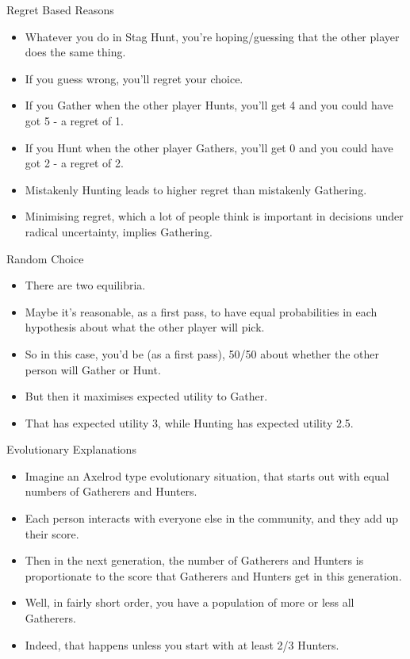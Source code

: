 \documentclass[
  ignorenonframetext,
]{beamer}
\providecommand{\tightlist}{%
  \setlength{\itemsep}{0pt}\setlength{\parskip}{0pt}}
\begin{document}
\begin{frame}{Regret Based Reasons}
\protect\hypertarget{regret-based-reasons}{}
\begin{itemize}
\tightlist
\item
  Whatever you do in Stag Hunt, you're hoping/guessing that the other
  player does the same thing.
\item
  If you guess wrong, you'll regret your choice. \pause
\item
  If you Gather when the other player Hunts, you'll get 4 and you could
  have got 5 - a regret of 1. \pause
\item
  If you Hunt when the other player Gathers, you'll get 0 and you could
  have got 2 - a regret of 2. \pause
\item
  Mistakenly Hunting leads to higher regret than mistakenly Gathering.
\item
  Minimising regret, which a lot of people think is important in
  decisions under radical uncertainty, implies Gathering.
\end{itemize}
\end{frame}

\begin{frame}{Random Choice}
\protect\hypertarget{random-choice}{}
\begin{itemize}
\tightlist
\item
  There are two equilibria.
\item
  Maybe it's reasonable, as a first pass, to have equal probabilities in
  each hypothesis about what the other player will pick.
\item
  So in this case, you'd be (as a first pass), 50/50 about whether the
  other person will Gather or Hunt. \pause
\item
  But then it maximises expected utility to Gather.
\item
  That has expected utility 3, while Hunting has expected utility 2.5.
\end{itemize}
\end{frame}

\begin{frame}{Evolutionary Explanations}
\protect\hypertarget{evolutionary-explanations}{}
\begin{itemize}
\tightlist
\item
  Imagine an Axelrod type evolutionary situation, that starts out with
  equal numbers of Gatherers and Hunters.
\item
  Each person interacts with everyone else in the community, and they
  add up their score.
\item
  Then in the next generation, the number of Gatherers and Hunters is
  proportionate to the score that Gatherers and Hunters get in this
  generation. \pause
\item
  Well, in fairly short order, you have a population of more or less all
  Gatherers.
\item
  Indeed, that happens unless you start with at least 2/3 Hunters.
\end{itemize}
\end{frame}
\end{document}
